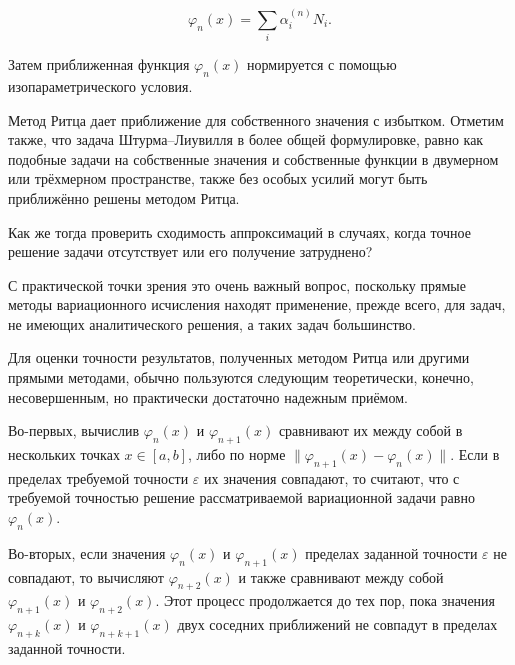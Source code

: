 \begin{displaymath}
	\varphi_{n}(x) = \sum_{i}^{} \alpha_{i}^{(n)} N_{i}. 
\end{displaymath}

\noindent Затем приближенная функция $\varphi_{n}(x)$ нормируется с помощью изопараметрического условия.

\begin{info}
	Метод Ритца дает приближение для собственного значения с избытком. Отметим также, что задача Штурма--Лиувилля в более общей формулировке, равно как подобные задачи на собственные значения и собственные функции в двумерном или трёхмерном пространстве, также без особых усилий могут быть приближённо решены методом Ритца.
\end{info}

\begin{question}
	Как же тогда проверить сходимость аппроксимаций в случаях, когда точное решение задачи отсутствует или его получение затруднено?
\end{question}

С практической точки зрения это очень важный вопрос, поскольку прямые методы вариационного исчисления находят применение, прежде всего, для задач, не имеющих аналитического решения, а таких задач большинство.

Для оценки точности результатов, полученных методом Ритца или другими прямыми методами, обычно пользуются следующим теоретически, конечно, несовершенным, но практически достаточно надежным приёмом.

Во-первых, вычислив $\varphi_{n}(x)$ и $\varphi_{n+1}(x)$ сравнивают их между собой в нескольких точках $ x \in \left[a, b\right] $, либо по норме $ \parallel\varphi_{n+1}(x) - \varphi_{n}(x)\parallel$. Если в пределах требуемой точности $ \varepsilon $ их значения совпадают, то считают, что с требуемой точностью решение рассматриваемой вариационной задачи равно $ \varphi_{n}(x) $.

Во-вторых, если значения $\varphi_{n}(x)$ и $\varphi_{n+1}(x)$ пределах заданной точности $\varepsilon$ не совпадают, то вычисляют $\varphi_{n+2}(x)$ и также сравнивают между собой $\varphi_{n+1}(x)$ и $\varphi_{n+2}(x)$. Этот процесс продолжается до тех пор, пока значения $\varphi_{n+k}(x)$ и $\varphi_{n+k+1}(x)$ двух соседних приближений не совпадут в пределах заданной точности.
